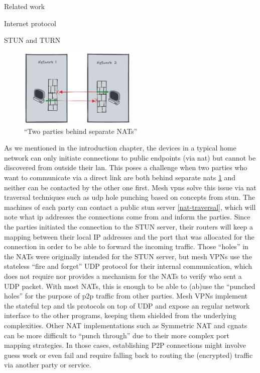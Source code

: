 \begin{frame}[fragile]{Related work}
\begin{block}{Internet protocol}
\begin{block}{STUN and TURN}
\protect\hypertarget{stun-and-turn}{}
\begin{figure}
\centering
\includegraphics[width=0.5\textwidth,height=0.25\textheight]{thesis/../figures/nat-intro.png}
\caption{``Two parties behind separate NATs''\label{nat-intro}}
\end{figure}

As we mentioned in the introduction chapter, the devices in a typical
home network can only initiate connections to public endpoints (via
\gls{nat}) but cannot be discovered from outside their \gls{lan}. This
poses a challenge when two parties who want to communicate via a direct
link are both behind separate \glspl{nat} \ref{nat-intro} and neither
can be contacted by the other one first. Mesh \glspl{vpn} solve this
issue via \gls{nat} traversal techniques such as \gls{udp} hole punching
based on concepts from \gls{stun}. The machines of each party can
contact a public \gls{stun} server \ref{nat-traversal}, which will note
what \gls{ip} addresses the connections come from and inform the
parties. Since the parties initiated the connection to the STUN server,
their routers will keep a mapping between their local IP addresses and
the port that was allocated for the connection in order to be able to
forward the incoming traffic. Those ``holes'' in the NATs were
originally intended for the STUN server, but mesh VPNs use the stateless
``fire and forget'' UDP protocol for their internal communication, which
does not require nor provides a mechanism for the NATs to verify who
sent a UDP packet. With most NATs, this is enough to be able to (ab)use
the ``punched holes'' for the purpose of \gls{p2p} traffic from other
parties. Mesh VPNs implement the stateful \gls{tcp} and \gls{tls}
protocols on top of UDP and expose an regular network interface to the
other programs, keeping them shielded from the underlying complexities.
Other NAT implementations such as Symmetric NAT and \glspl{cgnat} can be
more difficult to ``punch through'' due to their more complex port
mapping strategies. In those cases, establishing P2P connections might
involve guess work or even fail and require falling back to routing the
(encrypted) traffic via another party or service.


\end{block}
\end{block}
\end{frame}
